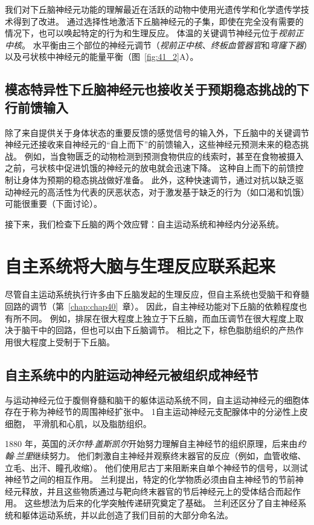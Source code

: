 我们对下丘脑神经元功能的理解最近在活跃的动物中使用光遗传学和化学遗传学技术得到了改进。
通过选择性地激活下丘脑神经元的子集，即使在完全没有需要的情况下，也可以唤起特定的行为和生理反应。
体温的关键调节神经元位于\textit{视前正中核}。
水平衡由三个部位的神经元调节（\textit{视前正中核}、\textit{终板血管器官}和\textit{穹窿下器}）以及弓状核中神经元的能量平衡（图~\ref{fig:41_2}A）。



\subsection{模态特异性下丘脑神经元也接收关于预期稳态挑战的下行前馈输入}

除了来自提供关于身体状态的重要反馈的感觉信号的输入外，下丘脑中的关键调节神经元还接收来自神经元的“自上而下”的前馈输入，这些神经元预测未来的稳态挑战。
例如，当食物匮乏的动物检测到预测食物供应的线索时，甚至在食物被摄入之前，弓状核中促进饥饿的神经元的放电就会迅速下降。
这种自上而下的前馈控制让身体为预期的稳态挑战做好准备。
此外，这种快速调节，通过对抗以缺乏驱动神经元的高活性为代表的厌恶状态，对于激发基于缺乏的行为（如口渴和饥饿）可能很重要（下面讨论）。


接下来，我们检查下丘脑的两个效应臂：自主运动系统和神经内分泌系统。



\section{自主系统将大脑与生理反应联系起来}

尽管自主运动系统执行许多由下丘脑发起的生理反应，但自主系统也受脑干和脊髓回路的调节（第~\ref{chap:chap40}~章）。
因此，自主神经功能对下丘脑的依赖程度也有所不同。
例如，排尿在很大程度上独立于下丘脑，而血压调节在很大程度上取决于脑干中的回路，但也可以由下丘脑调节。
相比之下，棕色脂肪组织的产热作用很大程度上受制于下丘脑。



\subsection{自主系统中的内脏运动神经元被组织成神经节}

与运动神经元位于腹侧脊髓和脑干的躯体运动系统不同，自主运动神经元的细胞体存在于称为神经节的周围神经扩张中。
1自主运动神经元支配腺体中的分泌性上皮细胞， 平滑肌和心肌，以及脂肪组织。


1880 年，英国的\textit{沃尔特$\cdot$盖斯凯尔}开始努力理解自主神经节的组织原理，后来由\textit{约翰$\cdot$兰里}继续努力。
他们刺激自主神经并观察终末器官的反应（例如，血管收缩、立毛、出汗、瞳孔收缩）。
他们使用尼古丁来阻断来自单个神经节的信号，以测试神经节之间的相互作用。
兰利提出，特定的化学物质必须由自主神经节的节前神经元释放，并且这些物质通过与靶向终末器官的节后神经元上的受体结合而起作用。
这些想法为后来的化学突触传递研究奠定了基础。
兰利还区分了自主神经系统和躯体运动系统，并以此创造了我们目前的大部分命名法。


